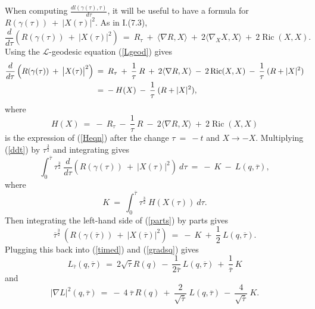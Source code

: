 \documentclass[12pt]{amsart}
\newcommand{\Ric}{\operatorname{Ric}}
\numberwithin{equation}{section}
\theoremstyle{plain}
\theoremstyle{definition}
\theoremstyle{remark}
\begin{document}
When computing $\frac{dl(\gamma(\tau), \tau)}{d\tau}$, it will be useful
to have a formula for $R(\gamma(\tau)) \: + \: \big| X(\tau) \big|^2$.
As in I.(7.3),
\begin{equation}
\frac{d}{d\tau} \left( R(\gamma(\tau)) \: + \: \big| X(\tau) \big|^2 \right)
\: = \:
R_\tau \: + \: \langle \nabla R, X \rangle \: + \: 2 \langle \nabla_X X, X
\rangle \: + \: 2 \Ric(X, X).
\end{equation}
Using the ${\mathcal L}$-geodesic equation (\ref{Lgeod}) gives
\begin{align} \label{ddt}
\frac{d}{d\tau} \left( R(\gamma(\tau)) \: + \: \big| X(\tau) \big|^2 \right)
\: & = \:
R_\tau \: + \: \frac{1}{\tau} \: R \: + \:
2 \langle \nabla R, X \rangle \: 
- \: 2 \Ric(X, X) \: - \: \frac{1}{\tau} \: (R + |X|^2) \\
& = \: - \: H(X) \: - \: \frac{1}{\tau} \: (R + |X|^2), \notag
\end{align}
where 
\begin{equation} \label{Hexp}
H(X) \: = \: - \: R_\tau \: - \: \frac{1}{\tau} \: R \: - \:
2 \langle \nabla R, X \rangle \: 
+ \: 2 \Ric(X, X)
\end{equation}
is the expression of (\ref{Heqn})
after the change $\tau \: = \:- t$ and $X \rightarrow -X$.
Multiplying (\ref{ddt}) by $\tau^{\frac32}$ and integrating gives
\begin{equation} \label{parts}
\int_0^{\overline{\tau}} \tau^{\frac32} \: 
\frac{d}{d\tau} \left( R(\gamma(\tau)) \: + \: \big| X(\tau) \big|^2 \right)
\: d\tau
\: = \: - \: K \: - \: L(q, \overline{\tau}),
\end{equation}
where
\begin{equation}
K \: = \: \int_0^{\overline{\tau}} \tau^{\frac32} \: H(X(\tau)) \: d\tau.
\end{equation}
Then integrating the left-hand side of (\ref{parts}) by parts gives
\begin{equation} \label{sub4}
\overline{\tau}^{\frac32} \: 
\left( R(\gamma(\overline{\tau})) \: + \: \big| X(\overline{\tau}) 
\big|^2 \right)
\: = \: - \: K \: + \: \frac12 \: L(q, \overline{\tau}).
\end{equation}
Plugging this back into  (\ref{timed}) and (\ref{gradsq}) gives
\begin{equation} \label{touse1}
L_{\overline{\tau}}(q, \overline{\tau}) \: = \:
2 \sqrt{\overline{\tau}} R(q) \:
- \: \frac{1}{2\overline{\tau}} \: L(q,\overline{\tau}) \: + \:
\frac{1}{\overline{\tau}} \: K
\end{equation}
and
\begin{equation} \label{ttouse1}
|\nabla L|^2(q, \overline{\tau}) \: = \: 
- \: 4 \: {\overline{\tau}} \: R(q) \: + \:
\frac{2}{\sqrt{\overline{\tau}}} \: L(q, \overline{\tau}) \: - \:
\frac{4}{\sqrt{\overline{\tau}}} \: K.
\end{equation}
\end{document}
